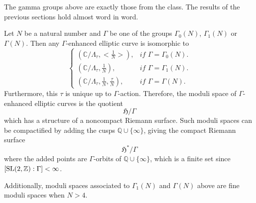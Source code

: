 \documentclass[a4paper,11pt]{article}
\begin{document}
The gamma groups above are exactly those from the class.
The results of the previous sections hold almost word in word.

\begin{thm}
Let $N$ be a natural number and $\Gamma$ be one of the groups $\Gamma_0(N)$, $\Gamma_1(N)$ or $\Gamma(N)$.
Then any $\Gamma$-enhanced elliptic curve is isomorphic to 
\[
\begin{cases}
(\mathbb{C}/\Lambda_{\tau},<\frac{1}{N}>), &\textit{if  }\Gamma=\Gamma_0(N).\\
(\mathbb{C}/\Lambda_{\tau},\frac{1}{N}), &\textit{if  }\Gamma=\Gamma_1(N).\\
(\mathbb{C}/\Lambda_{\tau},\frac{1}{N},\frac{\tau}{N}),  &\textit{if  }\Gamma=\Gamma(N).
\end{cases}
\]
Furthermore, this $\tau$ is unique up to  $\Gamma$-action.
Therefore, the moduli space of  $\Gamma$-enhanced elliptic curves is the quotient
\[
\mathfrak{H}/\Gamma
\]
which has a structure of a noncompact Riemann surface.
Such moduli spaces can be compactified by adding the cusps $\mathbb{Q}\cup\{\infty\}$, giving the compact Riemann surface
\[
\mathfrak{H}^*/\Gamma
\]
where the added points are $\Gamma$-orbits of $\mathbb{Q}\cup\{\infty\}$, which is a finite set since $[\textnormal{SL}(2,\mathbb{Z}):\Gamma]<\infty$.
\end{thm}

Additionally, moduli spaces associated to $\Gamma_1(N)$ and $\Gamma(N)$ above are fine moduli spaces when $N>4$.
\end{document}
